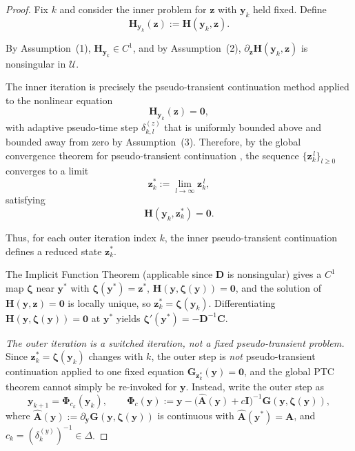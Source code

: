\documentclass[11pt,a4paper]{article}
\begin{document}
\begin{proof}
Fix $k$ and consider the inner problem for $\mathbf z$ with $\mathbf y_k$
held fixed. Define
\[
\mathbf H_{\mathbf y_k}(\mathbf z) := \mathbf H(\mathbf y_k,\mathbf z).
\]

By Assumption~(1), $\mathbf H_{\mathbf y_k} \in C^1$, and by
Assumption~(2), $\partial_{\mathbf z}\mathbf H(\mathbf y_k,\mathbf z)$ is
nonsingular in $\mathcal U$.

The inner iteration is precisely the pseudo-transient continuation method
applied to the nonlinear equation
\[
\mathbf H_{\mathbf y_k}(\mathbf z) = \mathbf 0,
\]
with adaptive pseudo-time step $\delta_{k,l}^{(z)}$ that is uniformly bounded
above and bounded away from zero by Assumption~(3).
Therefore, by the global convergence theorem for pseudo-transient continuation
\cite{kelley1998convergence}, the sequence $\{\mathbf z_k^{\,l}\}_{l\ge0}$
converges to a limit
\[
\mathbf z_k^* := \lim_{l\to\infty} \mathbf z_k^{\,l},
\]
satisfying
\[
\mathbf H(\mathbf y_k,\mathbf z_k^*) = \mathbf 0.
\]

Thus, for each outer iteration index $k$, the inner pseudo-transient
continuation defines a reduced state $\mathbf z_k^*$.

The Implicit Function Theorem (applicable since $\mathbf D$ is nonsingular) gives a
$C^1$ map $\boldsymbol\zeta$ near $\mathbf y^*$ with $\boldsymbol\zeta(\mathbf y^*)=\mathbf z^*$,
$\mathbf H(\mathbf y,\boldsymbol\zeta(\mathbf y))=\mathbf 0$, and the solution of
$\mathbf H(\mathbf y,\mathbf z)=\mathbf 0$ is locally unique, so
$\mathbf z_k^*=\boldsymbol\zeta(\mathbf y_k)$. Differentiating
$\mathbf H(\mathbf y,\boldsymbol\zeta(\mathbf y))=\mathbf 0$ at $\mathbf y^*$ yields
$\boldsymbol\zeta'(\mathbf y^*) = -\mathbf D^{-1}\mathbf C$.

\emph{The outer iteration is a switched iteration, not a fixed pseudo-transient problem.}
Since $\mathbf z_k^*=\boldsymbol\zeta(\mathbf y_k)$ changes with $k$, the outer step is
\emph{not} pseudo-transient continuation applied to one fixed equation
$\mathbf G_{\mathbf z_k^*}(\mathbf y)=\mathbf 0$, and the global PTC theorem cannot simply be
re-invoked for $\mathbf y$. Instead, write the outer step as
\[
\mathbf y_{k+1}=\boldsymbol\Phi_{c_k}(\mathbf y_k),\qquad
\boldsymbol\Phi_c(\mathbf y) :=
\mathbf y-\bigl(\hat{\mathbf A}(\mathbf y)+c\mathbf I\bigr)^{-1}\mathbf G(\mathbf y,\boldsymbol\zeta(\mathbf y)),
\]
where $\hat{\mathbf A}(\mathbf y):=\partial_{\mathbf y}\mathbf G(\mathbf y,\boldsymbol\zeta(\mathbf y))$ is
continuous with $\hat{\mathbf A}(\mathbf y^*)=\mathbf A$, and $c_k=(\delta_k^{(y)})^{-1}\in\Delta$.


\end{proof}
\end{document}
